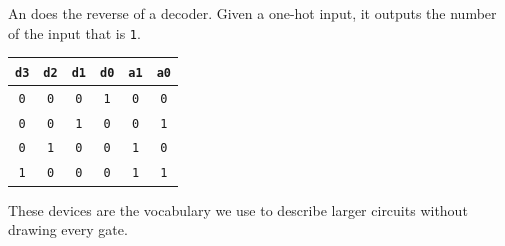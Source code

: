 \documentclass[mathserif, handout]{beamer}
\newcommand{\ttab}[1]{\texttt{#1}}
\begin{document}
\begin{frame}
  An  does the reverse of a decoder. Given a one-hot input, it outputs the number of the input that is \ttab{1}.\\[3mm]
  \begin{minipage}{0.45\textwidth}
    \centering
  \end{minipage}%
  \begin{minipage}{0.55\textwidth}
    \centering
    \renewcommand{\arraystretch}{1.2}
    \begin{tabular}{cccc|cc}
      \ttab{d3} & \ttab{d2} & \ttab{d1} & \ttab{d0} & \ttab{a1} & \ttab{a0} \\ \hline
      \ttab{0} & \ttab{0} & \ttab{0} & \ttab{1} & \ttab{0} & \ttab{0} \\
      \ttab{0} & \ttab{0} & \ttab{1} & \ttab{0} & \ttab{0} & \ttab{1} \\
      \ttab{0} & \ttab{1} & \ttab{0} & \ttab{0} & \ttab{1} & \ttab{0} \\
      \ttab{1} & \ttab{0} & \ttab{0} & \ttab{0} & \ttab{1} & \ttab{1} \\
    \end{tabular}
  \end{minipage}
\end{frame}

\begin{frame}
  \begin{center}
    These devices are the vocabulary we use to describe larger circuits without drawing every gate.
  \end{center}
\end{frame}
\end{document}
